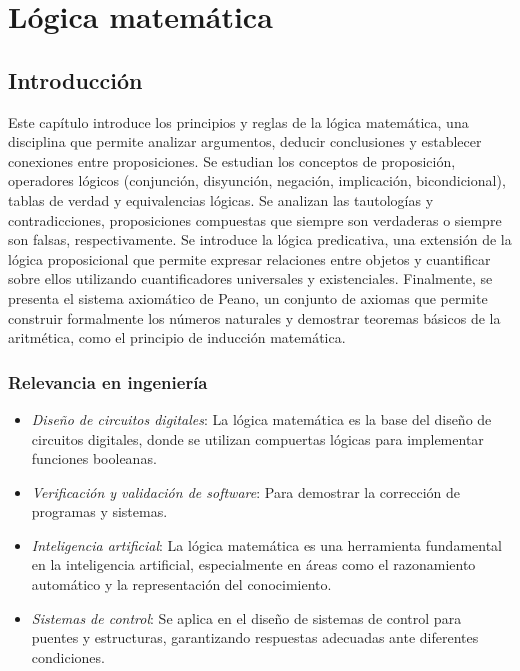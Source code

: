 \chapter{Lógica matemática}

\section*{Introducción}

Este capítulo introduce los principios y reglas de la lógica matemática, una disciplina que permite analizar argumentos, deducir conclusiones y establecer conexiones entre proposiciones. Se estudian los conceptos de proposición, operadores lógicos (conjunción, disyunción, negación, implicación, bicondicional), tablas de verdad y equivalencias lógicas.
Se analizan las tautologías y contradicciones, proposiciones compuestas que siempre son verdaderas o siempre son falsas, respectivamente. Se introduce la lógica predicativa, una extensión de la lógica proposicional que permite expresar relaciones entre objetos y cuantificar sobre ellos utilizando cuantificadores universales y existenciales.
Finalmente, se presenta el sistema axiomático de Peano, un conjunto de axiomas que permite construir formalmente los números naturales y demostrar teoremas básicos de la aritmética, como el principio de inducción matemática.

\subsection*{Relevancia en ingeniería}

\begin{itemize}
	\item \textit{Diseño de circuitos digitales}: La lógica matemática es la base del diseño de circuitos digitales, donde se utilizan compuertas lógicas para implementar funciones booleanas.
	\item \textit{Verificación y validación de software}: Para demostrar la corrección de programas y sistemas.
	\item \textit{Inteligencia artificial}: La lógica matemática es una herramienta fundamental en la inteligencia artificial, especialmente en áreas como el razonamiento automático y la representación del conocimiento.
	\item \textit{Sistemas de control}: Se aplica en el diseño de sistemas de control para puentes y estructuras, garantizando respuestas adecuadas ante diferentes condiciones.
\end{itemize}

